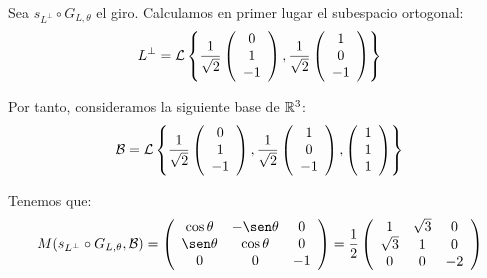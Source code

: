 \begin{ejercicio}
\begin{enumerate}
        Sea $s_{L^\perp}\circ G_{L,\theta}$ el giro. Calculamos en primer lugar el subespacio ortogonal:
        \begin{equation*}
            L^\perp = \mathcal{L}\left\{
            \frac{1}{\sqrt{2}} \left(\begin{array}{c}
                 0 \\ 1 \\ -1
            \end{array}\right),
            \frac{1}{\sqrt{2}}
            \left(\begin{array}{c}
                 1 \\ 0 \\ -1
            \end{array}\right)
            \right\}
        \end{equation*}
        
        Por tanto, consideramos la siguiente base de $\mathbb{R}^3$:
        \begin{equation*}
            \mathcal{B} = \mathcal{L}\left\{
            \frac{1}{\sqrt{2}} \left(\begin{array}{c}
                 0 \\ 1 \\ -1
            \end{array}\right),
            \frac{1}{\sqrt{2}}
            \left(\begin{array}{c}
                 1 \\ 0 \\ -1
            \end{array}\right),
            \left(\begin{array}{c}
                 1 \\ 1 \\ 1
            \end{array}\right)
            \right\}
        \end{equation*}

        Tenemos que:
        \begin{equation*}
            M(s_{L^\perp}\circ G_{L,\theta},\cc{B})=\left(\begin{array}{ccc}
                \cos \theta & -\sen \theta & 0 \\
                \sen \theta & \cos \theta & 0\\
                0& 0& -1
            \end{array}\right)
            = \frac{1}{2}\left(\begin{array}{ccc}
                1 & \sqrt{3} & 0 \\
                \sqrt{3} & 1 & 0\\
                0& 0& -2
            \end{array}\right)
        \end{equation*}
    \end{enumerate}
\end{ejercicio}


